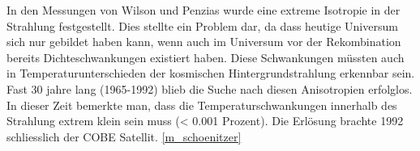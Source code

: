 In den Messungen von Wilson und Penzias wurde eine extreme Isotropie in der 
Strahlung festgestellt.
Dies stellte ein Problem dar, da dass heutige Universum sich nur gebildet haben 
kann, wenn auch im Universum vor der Rekombination bereits Dichteschwankungen 
existiert haben.
Diese Schwankungen müssten auch in Temperaturunterschieden der kosmischen 
Hintergrundstrahlung erkennbar sein.
Fast 30 jahre lang (1965-1992) blieb die Suche nach diesen Anisotropien 
erfolglos.
In dieser Zeit bemerkte man, dass die Temperaturschwankungen innerhalb des 
Strahlung extrem klein sein muss (< 0.001 Prozent).
Die Erlösung brachte 1992 schliesslich der COBE Satellit.
\ref{m_schoenitzer}